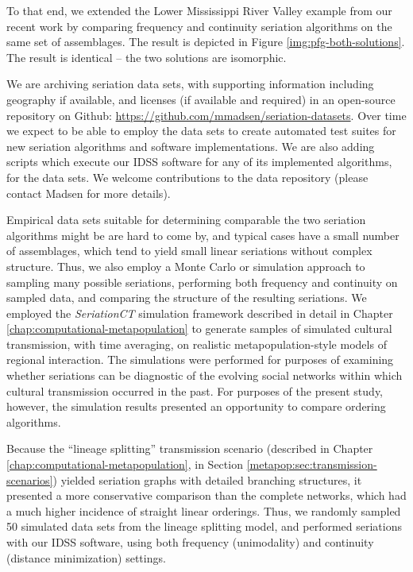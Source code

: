 To that end, we extended the Lower Mississippi River Valley example
from our recent work \citep{lipomadsendunnell2015} by comparing
frequency and continuity seriation algorithms on the same set of
assemblages.  The result is
depicted in Figure \ref{img:pfg-both-solutions}. The result is identical
-- the two solutions are isomorphic.  

We are archiving seriation data sets, with supporting information including geography 
if available, and licenses (if available
and required) in an open-source repository on Github:  \url{https://github.com/mmadsen/seriation-datasets}.  Over time we expect to be able to employ the data sets to create automated
test suites for new seriation algorithms and software implementations.  We are also adding scripts
which execute our IDSS software for any of its implemented algorithms, for the data sets.  We welcome 
contributions to the data repository (please contact Madsen for more details).  

Empirical data sets suitable for determining comparable the two seriation algorithms might be are hard to come by,
and typical cases have a small number of assemblages, which tend to yield small linear seriations without complex 
structure.  Thus, we also employ a Monte Carlo or simulation approach to sampling many possible seriations, 
performing both frequency and continuity on sampled data, and comparing the structure of the resulting seriations.
We employed the \emph{SeriationCT} simulation framework described in detail in Chapter \ref{chap:computational-metapopulation}
to generate samples of simulated cultural transmission, with time averaging, on realistic metapopulation-style models
of regional interaction.  The simulations were performed for purposes of examining whether seriations can be 
diagnostic of the evolving social networks within which cultural transmission occurred in the past.  For purposes
of the present study, however, the simulation results presented an opportunity to compare ordering algorithms.

Because the ``lineage splitting'' transmission scenario (described in Chapter \ref{chap:computational-metapopulation}, in Section 
\ref{metapop:sec:transmission-scenarios}) yielded seriation graphs with detailed branching structures, it presented a more 
conservative comparison than the complete networks, which had a much higher incidence of straight linear orderings.  Thus,
we randomly sampled 50 simulated data sets from the lineage splitting model, and performed seriations with our IDSS software, using both frequency (unimodality) and continuity (distance minimization) settings.




